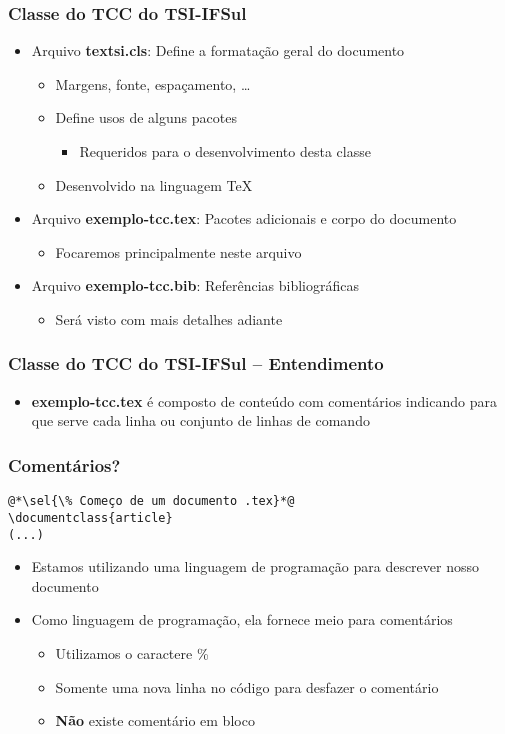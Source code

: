 \begin{frame} \frametitle{Classe do TCC do TSI-IFSul}
\begin{itemize}
	\item Arquivo \textbf{textsi.cls}: Define a formatação geral do documento
	\begin{itemize}
		\item Margens, fonte, espaçamento, \ldots
		\item Define usos de alguns pacotes
		\begin{itemize}
			\item Requeridos para o desenvolvimento desta classe
		\end{itemize}
		\item Desenvolvido na linguagem TeX
	\end{itemize}
	\item Arquivo \textbf{exemplo-tcc.tex}: Pacotes adicionais e corpo do documento
	\begin{itemize}
		\item Focaremos principalmente neste arquivo
	\end{itemize}
	\item Arquivo \textbf{exemplo-tcc.bib}: Referências bibliográficas
	\begin{itemize}
		\item Será visto com mais detalhes adiante
	\end{itemize}
\end{itemize}
\end{frame}

\begin{frame} \frametitle{Classe do TCC do TSI-IFSul -- Entendimento}
\begin{itemize}
	\item \textbf{exemplo-tcc.tex} é composto de conteúdo com comentários indicando para que serve cada linha ou conjunto de linhas de comando
\end{itemize}
\end{frame}

\begin{frame}[fragile] \frametitle{Comentários?}

\begin{lstlisting}
@*\sel{\% Começo de um documento .tex}*@
\documentclass{article} 
(...)
\end{lstlisting}

\begin{itemize}
	\item Estamos utilizando uma linguagem de programação para descrever nosso documento
	\item Como linguagem de programação, ela fornece meio para comentários
	\begin{itemize}
		\item Utilizamos o caractere \%
		\item Somente uma nova linha no código para desfazer o comentário
		\item \textbf{Não} existe comentário em bloco
	\end{itemize}
\end{itemize}
\end{frame}